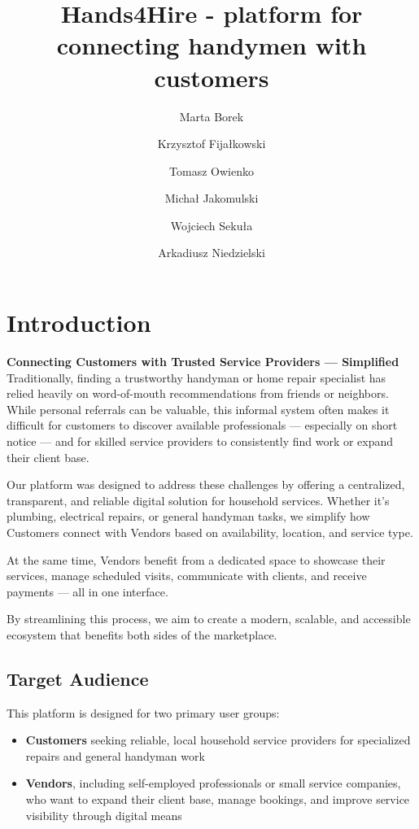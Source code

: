 \documentclass[11pt,a4paper]{article}
\title{Hands4Hire - platform for connecting handymen with customers}
\author{Marta Borek \and Krzysztof Fijałkowski \and Tomasz Owienko
\and Michał Jakomulski \and Wojciech Sekuła \and Arkadiusz Niedzielski}
\date{}
\begin{document}

\maketitle

\setcounter{tocdepth}{2}
\tableofcontents
\newpage

\section{Introduction}
\textbf{Connecting Customers with Trusted Service Providers --- Simplified} \\

Traditionally, finding a trustworthy handyman or home repair
specialist has relied heavily on word-of-mouth recommendations from
friends or neighbors. While personal referrals can be valuable, this
informal system often makes it difficult for customers to discover
available professionals — especially on short notice — and for
skilled service providers to consistently find work or expand their client base.

Our platform was designed to address these challenges by offering a
centralized, transparent, and reliable digital solution for household
services. Whether it’s plumbing, electrical repairs, or general
handyman tasks, we simplify how Customers connect with Vendors based
on availability, location, and service type.

At the same time, Vendors benefit from a dedicated space to showcase
their services, manage scheduled visits, communicate with clients,
and receive payments — all in one interface.

By streamlining this process, we aim to create a modern, scalable,
and accessible ecosystem that benefits both sides of the marketplace.

\subsection{Target Audience}

This platform is designed for two primary user groups:

\begin{itemize}
  \item \textbf{Customers} seeking reliable, local household service
    providers for specialized repairs and general handyman work
  \item \textbf{Vendors}, including self-employed professionals or
    small service companies, who want to expand their client base,
    manage bookings, and improve service visibility through digital means
\end{itemize}
\end{document}
